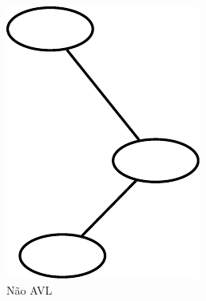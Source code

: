 \begin{frame}
\begin{columns}
		\begin{column}{0.33\textwidth}
			\begin{figure}
				\centering
				\includegraphics[width=.3\linewidth]{images/naoAVL}
				\caption{Não AVL}
				\label{fig:naoavl}
			\end{figure}
		\end{column}
	\end{columns}
\end{frame}

